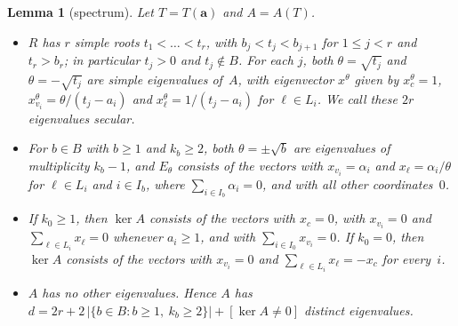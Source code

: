 \documentclass[11pt]{article}
\numberwithin{equation}{section}
\newtheorem{lemma}{Lemma}[section]
\theoremstyle{remark}
\newcommand{\bfa}{\mathbf a}
\begin{document}
\begin{lemma}[spectrum]\label{lem:spec}
Let $T=T(\bfa)$ and $A=A(T)$.
\begin{itemize}
\item[(i)] $R$ has $r$ simple roots $t_1<\dots<t_r$, with $b_j<t_j<b_{j+1}$ for
 $1\le j<r$ and $t_r>b_r$; in particular $t_j>0$ and $t_j\notin B$. For each
 $j$, both $\theta=\sqrt{t_j}$ and $\theta=-\sqrt{t_j}$ are simple eigenvalues
 of~$A$, with eigenvector $x^\theta$ given by $x^\theta_c=1$,
 $x^\theta_{v_i}=\theta/(t_j-a_i)$ and $x^\theta_\ell=1/(t_j-a_i)$ for
 $\ell\in L_i$. We call these $2r$ eigenvalues \emph{secular}.
\item[(ii)] For $b\in B$ with $b\ge1$ and $k_b\ge2$, both $\theta=\pm\sqrt b$ are
 eigenvalues of multiplicity $k_b-1$, and $E_\theta$ consists of the vectors
 with $x_{v_i}=\alpha_i$ and $x_\ell=\alpha_i/\theta$ for $\ell\in L_i$ and
 $i\in I_b$, where $\sum_{i\in I_b}\alpha_i=0$, and with all other
 coordinates~$0$.
\item[(iii)] If $k_0\ge1$, then $\ker A$ consists of the vectors with $x_c=0$,
 with $x_{v_i}=0$ and $\sum_{\ell\in L_i}x_\ell=0$ whenever $a_i\ge1$, and with
 $\sum_{i\in I_0}x_{v_i}=0$. If $k_0=0$, then $\ker A$ consists of the vectors
 with $x_{v_i}=0$ and $\sum_{\ell\in L_i}x_\ell=-x_c$ for every~$i$.
\item[(iv)] $A$ has no other eigenvalues. Hence $A$ has
 $d=2r+2\,|\{b\in B:b\ge1,\ k_b\ge2\}|+[\ker A\ne0]$ distinct eigenvalues.
\end{itemize}
\end{lemma}
\end{document}
